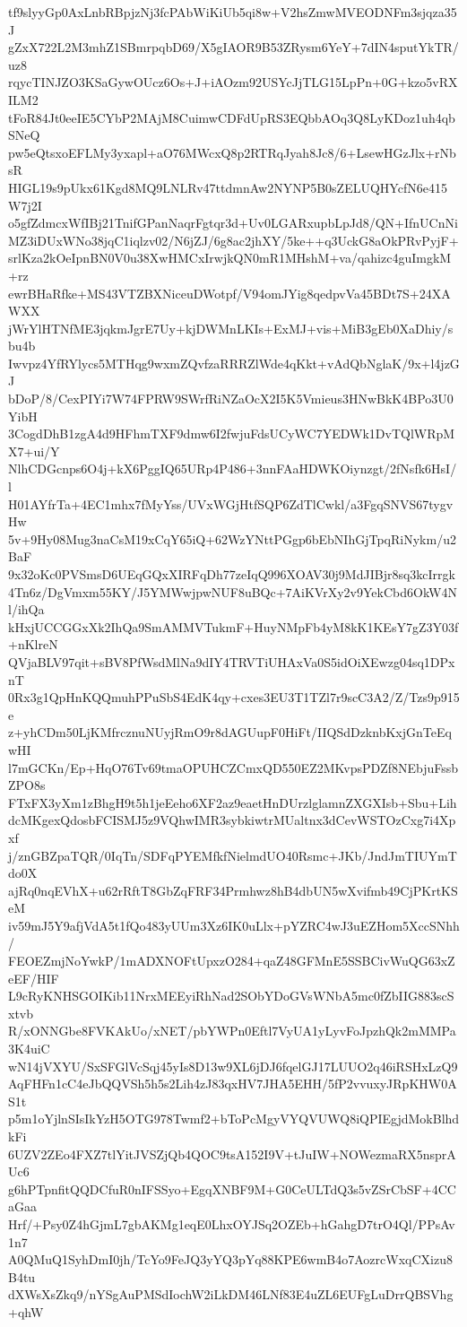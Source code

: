 tf9slyyGp0AxLnbRBpjzNj3fcPAbWiKiUb5qi8w+V2hsZmwMVEODNFm3sjqza35J
gZxX722L2M3mhZ1SBmrpqbD69/X5gIAOR9B53ZRysm6YeY+7dIN4sputYkTR/uz8
rqycTINJZO3KSaGywOUcz6Os+J+iAOzm92USYcJjTLG15LpPn+0G+kzo5vRXILM2
tFoR84Jt0eeIE5CYbP2MAjM8CuimwCDFdUpRS3EQbbAOq3Q8LyKDoz1uh4qbSNeQ
pw5eQtsxoEFLMy3yxapl+aO76MWcxQ8p2RTRqJyah8Jc8/6+LsewHGzJlx+rNbsR
HIGL19s9pUkx61Kgd8MQ9LNLRv47ttdmnAw2NYNP5B0sZELUQHYcfN6e415W7j2I
o5gfZdmcxWfIBj21TnifGPanNaqrFgtqr3d+Uv0LGARxupbLpJd8/QN+IfnUCnNi
MZ3iDUxWNo38jqC1iqlzv02/N6jZJ/6g8ac2jhXY/5ke++q3UckG8aOkPRvPyjF+
srlKza2kOeIpnBN0V0u38XwHMCxIrwjkQN0mR1MHshM+va/qahizc4guImgkM+rz
ewrBHaRfke+MS43VTZBXNiceuDWotpf/V94omJYig8qedpvVa45BDt7S+24XAWXX
jWrYlHTNfME3jqkmJgrE7Uy+kjDWMnLKIs+ExMJ+vis+MiB3gEb0XaDhiy/sbu4b
Iwvpz4YfRYlycs5MTHqg9wxmZQvfzaRRRZlWde4qKkt+vAdQbNglaK/9x+l4jzGJ
bDoP/8/CexPIYi7W74FPRW9SWrfRiNZaOcX2I5K5Vmieus3HNwBkK4BPo3U0YibH
3CogdDhB1zgA4d9HFhmTXF9dmw6I2fwjuFdsUCyWC7YEDWk1DvTQlWRpMX7+ui/Y
NlhCDGcnps6O4j+kX6PggIQ65URp4P486+3nnFAaHDWKOiynzgt/2fNsfk6HsI/l
H01AYfrTa+4EC1mhx7fMyYss/UVxWGjHtfSQP6ZdTlCwkl/a3FgqSNVS67tygvHw
5v+9Hy08Mug3naCsM19xCqY65iQ+62WzYNttPGgp6bEbNIhGjTpqRiNykm/u2BaF
9x32oKc0PVSmsD6UEqGQxXIRFqDh77zeIqQ996XOAV30j9MdJIBjr8sq3kcIrrgk
4Tn6z/DgVmxm55KY/J5YMWwjpwNUF8uBQc+7AiKVrXy2v9YekCbd6OkW4Nl/ihQa
kHxjUCCGGxXk2IhQa9SmAMMVTukmF+HuyNMpFb4yM8kK1KEsY7gZ3Y03f+nKlreN
QVjaBLV97qit+sBV8PfWsdMlNa9dIY4TRVTiUHAxVa0S5idOiXEwzg04sq1DPxnT
0Rx3g1QpHnKQQmuhPPuSbS4EdK4qy+cxes3EU3T1TZl7r9scC3A2/Z/Tzs9p915e
z+yhCDm50LjKMfrcznuNUyjRmO9r8dAGUupF0HiFt/IIQSdDzknbKxjGnTeEqwHI
l7mGCKn/Ep+HqO76Tv69tmaOPUHCZCmxQD550EZ2MKvpsPDZf8NEbjuFssbZPO8s
FTxFX3yXm1zBhgH9t5h1jeEeho6XF2az9eaetHnDUrzlglamnZXGXIsb+Sbu+Lih
dcMKgexQdosbFCISMJ5z9VQhwIMR3sybkiwtrMUaltnx3dCevWSTOzCxg7i4Xpxf
j/znGBZpaTQR/0IqTn/SDFqPYEMfkfNielmdUO40Rsmc+JKb/JndJmTIUYmTdo0X
ajRq0nqEVhX+u62rRftT8GbZqFRF34Prmhwz8hB4dbUN5wXvifmb49CjPKrtKSeM
iv59mJ5Y9afjVdA5t1fQo483yUUm3Xz6IK0uLlx+pYZRC4wJ3uEZHom5XccSNhh/
FEOEZmjNoYwkP/1mADXNOFtUpxzO284+qaZ48GFMnE5SSBCivWuQG63xZeEF/HIF
L9cRyKNHSGOIKib11NrxMEEyiRhNad2SObYDoGVsWNbA5mc0fZbIIG883scSxtvb
R/xONNGbe8FVKAkUo/xNET/pbYWPn0Eftl7VyUA1yLyvFoJpzhQk2mMMPa3K4uiC
wN14jVXYU/SxSFGlVcSqj45yIs8D13w9XL6jDJ6fqelGJ17LUUO2q46iRSHxLzQ9
AqFHFn1cC4eJbQQVSh5h5s2Lih4zJ83qxHV7JHA5EHH/5fP2vvuxyJRpKHW0AS1t
p5m1oYjlnSIsIkYzH5OTG978Twmf2+bToPcMgyVYQVUWQ8iQPIEgjdMokBlhdkFi
6UZV2ZEo4FXZ7tlYitJVSZjQb4QOC9tsA152I9V+tJuIW+NOWezmaRX5nsprAUc6
g6hPTpnfitQQDCfuR0nIFSSyo+EgqXNBF9M+G0CeULTdQ3s5vZSrCbSF+4CCaGaa
Hrf/+Psy0Z4hGjmL7gbAKMg1eqE0LhxOYJSq2OZEb+hGahgD7trO4Ql/PPsAv1n7
A0QMuQ1SyhDmI0jh/TcYo9FeJQ3yYQ3pYq88KPE6wmB4o7AozrcWxqCXizu8B4tu
dXWsXsZkq9/nYSgAuPMSdIochW2iLkDM46LNf83E4uZL6EUFgLuDrrQBSVhg+qhW
